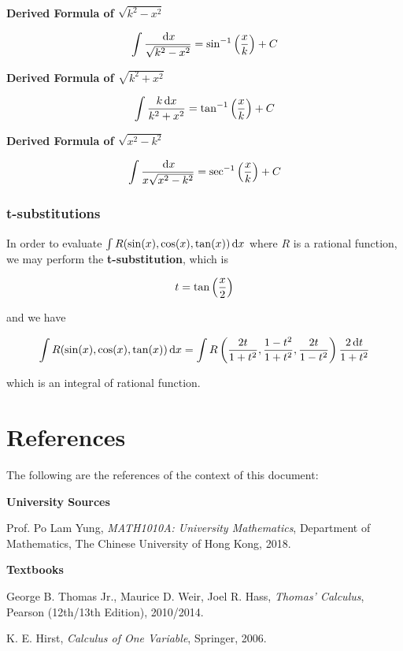 \documentclass[a4paper,12pt]{article}
\begin{document}
\begin{alist}
  \item \textbf{Derived Formula of $\sqrt{k^{2}-x^{2}}$}

  $$\int\frac{\,\mathrm{d} x}{\sqrt{k^{2}-x^{2}}}=\sin^{-1}\left( \frac{x}{k}\right)+C$$

  \item \textbf{Derived Formula of $\sqrt{k^{2}+x^{2}}$}

  $$\int\frac{k\,\mathrm{d} x}{k^{2}+x^{2}}=\tan^{-1}\left( \frac{x}{k}\right)+C$$

  \item \textbf{Derived Formula of $\sqrt{x^{2}-k^{2}}$}

  $$\int\frac{\,\mathrm{d} x}{x\sqrt{x^{2}-k^{2}}}=\sec^{-1}\left( \frac{x}{k}\right)+C$$
\end{alist}

\subsubsection{t-substitutions}
In order to evaluate $\int R(\sin(x),\cos(x),\tan(x))\,\mathrm{d} x$ where $R$ is a rational function, we may perform the \textbf{t-substitution}, which is

$$t=\tan\left( \frac{x}{2}\right)$$\s

and we have

$$\int R(\sin(x),\cos(x),\tan(x))\,\mathrm{d} x=\int R\left( \frac{2t}{1+t^{2}},\frac{1-t^{2}}{1+t^{2}},\frac{2t}{1-t^{2}}\right)\frac{2\,\mathrm{d} t}{1+t^{2}}$$\s

which is an integral of rational function.

\pagebreak

\section*{References}
The following are the references of the context of this document:

\begin{alist}
  \item \textbf{University Sources}

  \begin{rlist}
    \item Prof. Po Lam Yung, \textit{MATH1010A: University Mathematics}, Department of Mathematics, The Chinese University of Hong Kong, 2018.
  \end{rlist}

  \item \textbf{Textbooks}

  \begin{rlist}
    \item George B. Thomas Jr., Maurice D. Weir, Joel R. Hass, \textit{Thomas' Calculus}, Pearson (12th/13th Edition), 2010/2014.
    \item K. E. Hirst, \textit{Calculus of One Variable}, Springer, 2006.
  \end{rlist}
\end{alist}

\pagebreak
\end{document}
